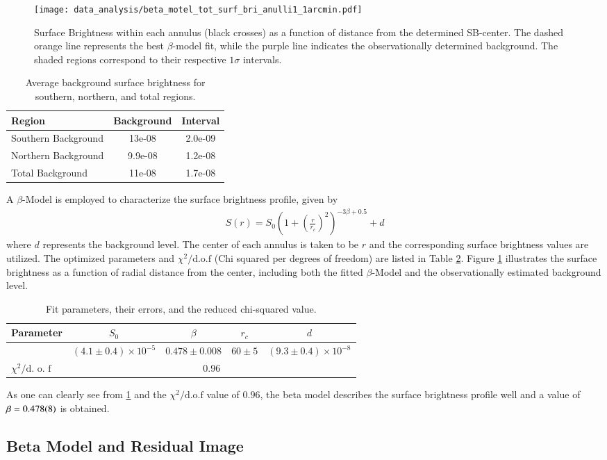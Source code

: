\begin{figure}[htbp]
    \centering
    \texttt{[image: data\_analysis/beta\_motel\_tot\_surf\_bri\_anulli1\_1arcmin.pdf]}
    \caption{Surface Brightness within each annulus (black crosses) as a function of distance from the determined SB-center. The dashed orange line represents the best \(\beta\)-model fit, while the purple line indicates the observationally determined background. The shaded regions correspond to their respective \(1\sigma\) intervals.}
    \label{fig:tot_azimuthal_beta_model}
\end{figure}
\begin{table}[h]
    \centering
    \begin{tabular}{lS[table-format=1.2e-1]S[table-format=1.2e-1]}
        \toprule
        Region & {Background} & {Interval} \\
        \midrule
        Southern Background & 13e-08 & 2.0e-09 \\
        Northern Background & 9.9e-08 & 1.2e-08 \\
        Total Background    & 11e-08 & 1.7e-08 \\
        \bottomrule
    \end{tabular}
    \caption{Average background surface brightness for southern, northern, and total regions.}
    \label{tab:background}
\end{table}
A \(\beta\)-Model is employed to characterize the surface brightness profile, given by
\begin{align*}
    S(r) = S_0 \left(1 + \left(\frac{r}{r_c}\right)^2\right)^{-3\beta + 0.5} + d
\end{align*}
where \(d\) represents the background level. The center of each annulus is taken to be \(r\) and the corresponding surface brightness values are utilized. The optimized parameters and \(\chi^2 / \text{d.o.f}\) (Chi squared per degrees of freedom) are listed in Table \ref{table:full_az_fit_parameters}. Figure \ref{fig:tot_azimuthal_beta_model} illustrates the surface brightness as a function of radial distance from the center, including both the fitted \(\beta\)-Model and the observationally estimated background level.
\begin{table}[h!]
    \centering
    \begin{tabular}{lcccc}
    \toprule
    Parameter & $S_0$ & $\beta$ & $r_c$ & $d$ \\
    \midrule
        & $(4.1 \pm 0.4) \times 10^{-5}$ & $0.478 \pm 0.008$ & $60 \pm 5$ & $(9.3 \pm 0.4) \times 10^{-8}$ \\
    \midrule
    \(\chi^2 / \text{d. o. f}\) & \multicolumn{4}{c}{0.96} \\
    \bottomrule
    \end{tabular}
    \caption{Fit parameters, their errors, and the reduced chi-squared value.}
    \label{table:full_az_fit_parameters}
\end{table}
As one can clearly see from \ref{fig:tot_azimuthal_beta_model} and the \(\chi^2/\text{d.o.f}\) value of \(0.96\), the beta model describes the surface brightness profile well and a value of \(\beta = \num{0.478\pm0.008}\) is obtained.
\subsection{Beta Model and Residual Image}

